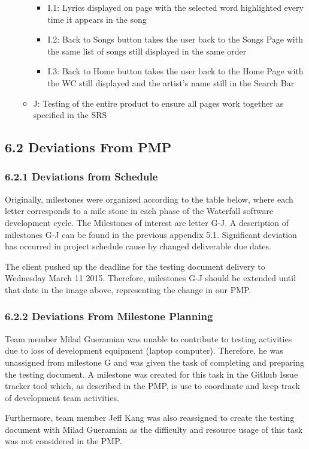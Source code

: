 \documentclass[]{article}
\begin{document}
\begin{itemize}
\begin{itemize}
    \begin{itemize}
    \itemsep1pt\parskip0pt
    \item
      I.1: Lyrics displayed on page with the selected word highlighted
      every time it appears in the song
    \item
      I.2: Back to Songs button takes the user back to the Songs Page
      with the same list of songs still displayed in the same order
    \item
      I.3: Back to Home button takes the user back to the Home Page with
      the WC still displayed and the artist's name still in the Search
      Bar
    \end{itemize}
  \item
    J: Testing of the entire product to ensure all pages work together
    as specified in the SRS
  \end{itemize}
\end{itemize}

\subsection{\textbf{6.2 Deviations From PMP}}\label{deviations-from-pmp}

\subsubsection{\textbf{6.2.1 Deviations from
Schedule}}\label{deviations-from-schedule}

Originally, milestones were organized according to the table below,
where each letter corresponds to a mile stone in each phase of the
Waterfall software development cycle. The Milestones of interest are
letter G-J. A description of milestones G-J can be found in the previous
appendix 5.1. Significant deviation has occurred in project schedule
cause by changed deliverable due dates.

The client pushed up the deadline for the testing document delivery to
Wednesday March 11 2015. Therefore, milestones G-J should be extended
until that date in the image above, representing the change in our PMP.

\subsubsection{\textbf{6.2.2 Deviations From Milestone
Planning}}\label{deviations-from-milestone-planning}

Team member Milad Gueramian was unable to contribute to testing
activities due to loss of development equipment (laptop computer).
Therefore, he was unassigned from milestone G and was given the task of
completing and preparing the testing document. A milestone was created
for this task in the Github Issue tracker tool which, as described in
the PMP, is use to coordinate and keep track of development team
activities.

Furthermore, team member Jeff Kang was also reassigned to create the
testing document with Milad Gueramian as the difficulty and resource
usage of this task was not considered in the PMP.
\end{document}
